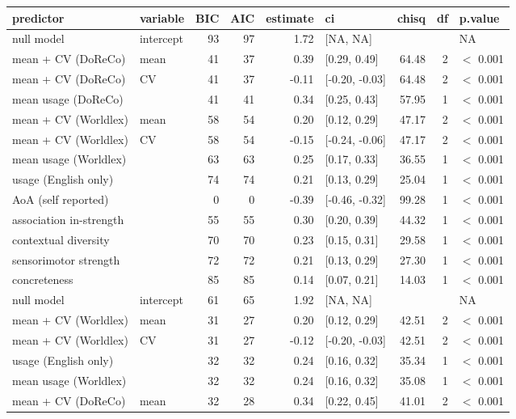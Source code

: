 \begin{table}[ht]
\centering
\begin{tabular}{llrrrlrrl}
  \hline
predictor & variable & BIC & AIC & estimate & ci & chisq & df & p.value \\ 
  \hline
null model & intercept & 93 & 97 & 1.72 & [NA, NA] &  &  & NA \\ 
  mean + CV (DoReCo) & mean & 41 & 37 & 0.39 & [0.29, 0.49] & 64.48 & 2 & $<$ 0.001 \\ 
  mean + CV (DoReCo) & CV & 41 & 37 & -0.11 & [-0.20, -0.03] & 64.48 & 2 & $<$ 0.001 \\ 
  mean usage (DoReCo) &  & 41 & 41 & 0.34 & [0.25, 0.43] & 57.95 & 1 & $<$ 0.001 \\ 
  mean + CV (Worldlex) & mean & 58 & 54 & 0.20 & [0.12, 0.29] & 47.17 & 2 & $<$ 0.001 \\ 
  mean + CV (Worldlex) & CV & 58 & 54 & -0.15 & [-0.24, -0.06] & 47.17 & 2 & $<$ 0.001 \\ 
  mean usage (Worldlex) &  & 63 & 63 & 0.25 & [0.17, 0.33] & 36.55 & 1 & $<$ 0.001 \\ 
  usage (English only) &  & 74 & 74 & 0.21 & [0.13, 0.29] & 25.04 & 1 & $<$ 0.001 \\ 
  AoA (self reported) &  & 0 & 0 & -0.39 & [-0.46, -0.32] & 99.28 & 1 & $<$ 0.001 \\ 
  association in-strength &  & 55 & 55 & 0.30 & [0.20, 0.39] & 44.32 & 1 & $<$ 0.001 \\ 
  contextual diversity &  & 70 & 70 & 0.23 & [0.15, 0.31] & 29.58 & 1 & $<$ 0.001 \\ 
  sensorimotor strength &  & 72 & 72 & 0.21 & [0.13, 0.29] & 27.30 & 1 & $<$ 0.001 \\ 
  concreteness &  & 85 & 85 & 0.14 & [0.07, 0.21] & 14.03 & 1 & $<$ 0.001 \\ 
  null model & intercept & 61 & 65 & 1.92 & [NA, NA] &  &  & NA \\ 
  mean + CV (Worldlex) & mean & 31 & 27 & 0.20 & [0.12, 0.29] & 42.51 & 2 & $<$ 0.001 \\ 
  mean + CV (Worldlex) & CV & 31 & 27 & -0.12 & [-0.20, -0.03] & 42.51 & 2 & $<$ 0.001 \\ 
  usage (English only) &  & 32 & 32 & 0.24 & [0.16, 0.32] & 35.34 & 1 & $<$ 0.001 \\ 
  mean usage (Worldlex) &  & 32 & 32 & 0.24 & [0.16, 0.32] & 35.08 & 1 & $<$ 0.001 \\ 
  mean + CV (DoReCo) & mean & 32 & 28 & 0.34 & [0.22, 0.45] & 41.01 & 2 & $<$ 0.001 \\ 

\end{tabular}
\end{table}
